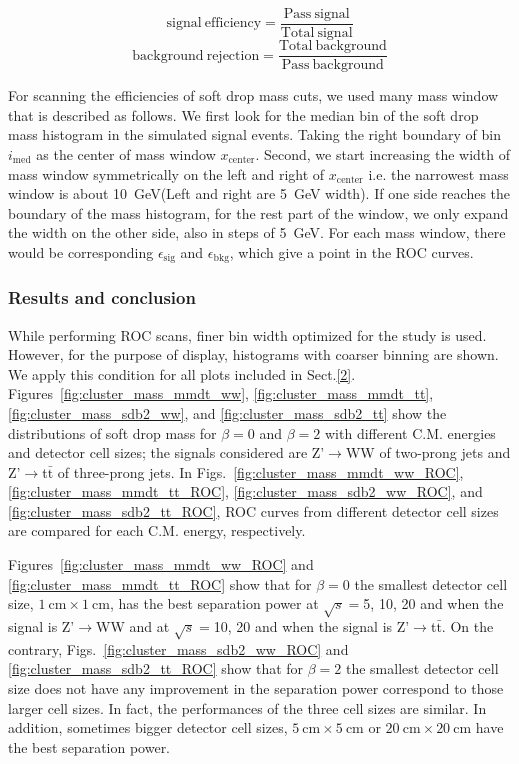 \documentclass[12pt,twoside,a4paper,an,final]{cms-tdr}
\begin{document}
\begin{equation}\label{Equa_SIG}
\mathrm{\mathrm{signal \ efficiency} = \frac{Pass \ signal}{Total \ signal}}
\end{equation}
\begin{equation}\label{Equa_BKG}
\mathrm{\mathrm{background \ rejection}= \frac{Total \ background}{Pass \ background}}
\end{equation}

For scanning the efficiencies of soft drop mass cuts, we used many mass 
window that is described as follows. We first look for the median bin 
 of the soft drop mass histogram in the simulated signal events. Taking the right boundary
 of bin $i_\mathrm{med}$ as the center of mass window 
$x_\mathrm{center}$. Second, we start increasing the width of mass window symmetrically
 on the left and right of $x_\mathrm{center}$ i.e. the narrowest mass window is 
about 10~GeV(Left and right are 5~GeV width). If one side reaches the boundary of the mass histogram, for the rest part of the window, we only expand the width on the other side, also in 
steps of 5~GeV. For each mass window, there would be corresponding 
$\epsilon_\mathrm{sig}$ and $\epsilon_\mathrm{bkg}$, which give a point in the ROC curves.

\subsubsection{Results and conclusion}
While performing ROC scans, finer bin width optimized for the study is used. However, for the purpose of display, histograms with coarser binning are shown. We apply this condition for all plots included in Sect.\ref{2}.
Figures~\ref{fig:cluster_mass_mmdt_ww}, \ref{fig:cluster_mass_mmdt_tt},
 \ref{fig:cluster_mass_sdb2_ww}, and \ref{fig:cluster_mass_sdb2_tt} 
show the distributions of soft drop mass for $\beta=0$ and $\beta=2$ with 
different C.M. energies and detector cell sizes; the signals considered are 
Z'$\rightarrow$WW of two-prong jets and Z'$\rightarrow$t$\bar{\mathrm{t}}$ of three-prong jets. 
In Figs.~\ref{fig:cluster_mass_mmdt_ww_ROC}, \ref{fig:cluster_mass_mmdt_tt_ROC}, \ref{fig:cluster_mass_sdb2_ww_ROC}, and \ref{fig:cluster_mass_sdb2_tt_ROC}, 
ROC curves from different detector cell sizes are compared for each C.M. energy, respectively. 

Figures~\ref{fig:cluster_mass_mmdt_ww_ROC} and \ref{fig:cluster_mass_mmdt_tt_ROC} show that for $\beta=0$ the smallest detector cell size, $1~\mathrm{cm}\times1~\mathrm{cm}$, has the best separation power at $\sqrt{s}=$5, 10, 20 and when the signal is Z'$\rightarrow$WW and at  $\sqrt{s}=$10, 20 and when the signal is Z'$\rightarrow$t$\bar{\mathrm{t}}$.
On the contrary, Figs.~\ref{fig:cluster_mass_sdb2_ww_ROC} and \ref{fig:cluster_mass_sdb2_tt_ROC} show that for $\beta=2$ the smallest detector cell size 
does not have any improvement in the separation power correspond to those 
larger cell sizes. In fact, the performances of the three cell sizes are 
similar. In addition, sometimes bigger detector cell sizes, 
$5~\mathrm{cm}\times5~\mathrm{cm}$ or $20~\mathrm{cm}\times20~\mathrm{cm}$
 have the best separation power. 
\end{document}
